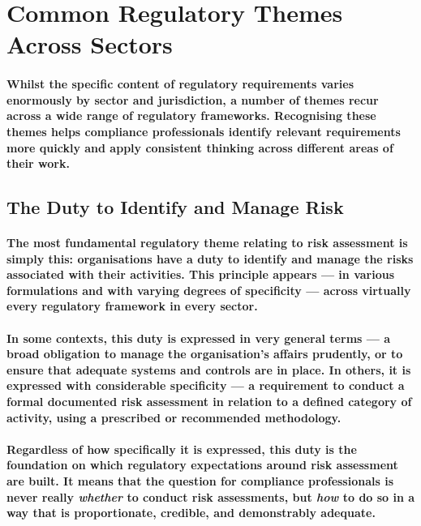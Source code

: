 \section{Common Regulatory Themes Across Sectors}
\paragraph{Whilst the specific content of regulatory requirements varies enormously by sector and jurisdiction, a number of themes recur across a wide range of regulatory frameworks. Recognising these themes helps compliance professionals identify relevant requirements more quickly and apply consistent thinking across different areas of their work.}

\subsection{The Duty to Identify and Manage Risk}
\paragraph{The most fundamental regulatory theme relating to risk assessment is simply this: \textbf{organisations have a duty to identify and manage the risks associated with their activities}. This principle appears — in various formulations and with varying degrees of specificity — across virtually every regulatory framework in every sector.}
\paragraph{In some contexts, this duty is expressed in very general terms — a broad obligation to manage the organisation's affairs prudently, or to ensure that adequate systems and controls are in place. In others, it is expressed with considerable specificity — a requirement to conduct a formal documented risk assessment in relation to a defined category of activity, using a prescribed or recommended methodology.}
\paragraph{Regardless of how specifically it is expressed, this duty is the foundation on which regulatory expectations around risk assessment are built. It means that the question for compliance professionals is never really \textit{whether} to conduct risk assessments, but \textit{how} to do so in a way that is proportionate, credible, and demonstrably adequate.}

